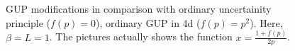 \documentclass[10pt,a4paper]{article}
\begin{document}
\clearpage %
%
\begin{figure}
\centering
{}%
\caption{GUP modifications in comparison with ordinary uncertainity principle ($f(p)=0$), ordinary GUP in 4d ($f(p)=p^2$). Here, $\beta=L=1$. The pictures actually shows the function $x = \frac{1 + f(p)}{2 p}$.
}\label{fig:gup}
\end{figure}
%
\end{document}
